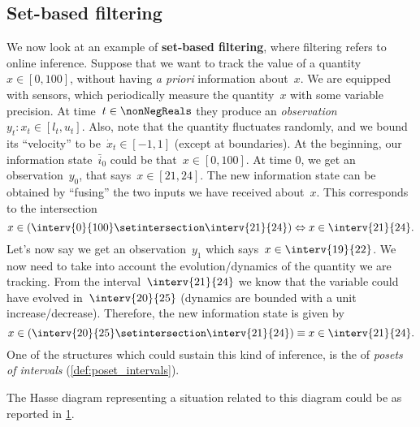 \subsection{Set-based filtering}
We now look at an example of \textbf{set-based filtering}, where filtering refers to online inference.
Suppose that we want to track the value of a quantity~$x\in [0,100]$, without having \emph{a priori} information about~$x$.
We are equipped with sensors, which periodically measure the quantity~$x$ with some variable precision.
At time~$t\in \nonNegReals $ they produce an \emph{observation}~$y_t\colon x_t\in [l_t,u_t]$.
Also, note that the quantity fluctuates randomly, and we bound its ``velocity'' to be~$\dot{x}_t\in [-1,1]$ (except at boundaries).
At the beginning, our information state~$\bar{i}_0$ could be that~$x\in [0,100]$.
At time 0, we get an observation~$y_0$, that says~$x\in [21,24]$.
The new information state can be obtained by ``fusing'' the two inputs we have received about~$x$.
This corresponds to the intersection
\begin{equation*}
    x\in \left( \interv{0}{100} \setintersection \interv{21}{24}\right)\Leftrightarrow x\in \interv{21}{24}.
\end{equation*}
Let's now say we get an observation~$y_1$ which says~$x\in \interv{19}{22}$.
We now need to take into account the evolution/dynamics of the quantity we are tracking.
From the interval~$\interv{21}{24}$ we know that the variable could have evolved in~$\interv{20}{25}$ (dynamics are bounded with a unit increase/decrease).
Therefore, the new information state is given by
\begin{equation*}
    x\in \left( \interv{20}{25} \setintersection \interv{21}{24}\right)\equiv x\in \interv{21}{24}.
\end{equation*}
One of the structures which could sustain this kind of inference, is the of \emph{posets of intervals} (\cref{def:poset_intervals}).

The Hasse diagram representing a situation related to this diagram could be as reported in \cref{fig:hasse_filtering}.
\begin{figure}[h!]
    \centering
    \caption{}
    \label{fig:hasse_filtering}
\end{figure}

